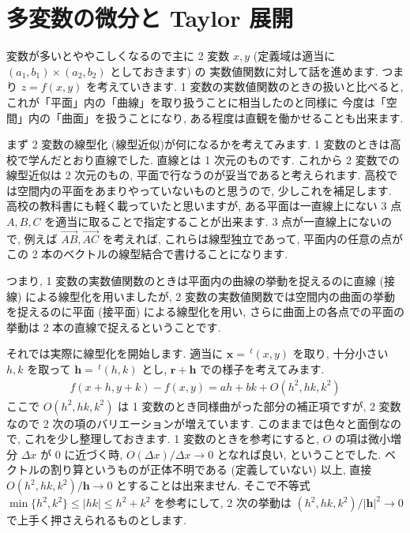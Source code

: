 \documentclass[openany, a4paper, oneside]{jsbook}
\begin{document}
\section{多変数の微分と Taylor 展開}

変数が多いとややこしくなるので主に 2 変数 $x,y$ (定義域は適当に $(a_1,b_1)\times (a_2,b_2)$ としておきます) の
実数値関数に対して話を進めます.
つまり $z=f (x,y)$ を考えていきます.
1 変数の実数値関数のときの扱いと比べると, これが「平面」内の「曲線」を取り扱うことに相当したのと同様に
今度は「空間」内の「曲面」を扱うことになり, ある程度は直観を働かせることも出来ます.

まず 2 変数の線型化 (線型近似)が何になるかを考えてみます.
1 変数のときは高校で学んだとおり直線でした.
直線とは 1 次元のものです.
これから 2 変数での線型近似は 2 次元のもの, 平面で行なうのが妥当であると考えられます.
高校では空間内の平面をあまりやっていないものと思うので, 少しこれを補足します.
高校の教科書にも軽く載っていたと思いますが, ある平面は一直線上にない 3 点 $A,B,C$ を適当に取ることで指定することが出来ます.
3 点が一直線上にないので, 例えば $\overrightarrow{AB},\overrightarrow{AC}$ を考えれば, これらは線型独立であって, 平面内の任意の点が
この 2 本のベクトルの線型結合で書けることになります.

つまり, 1 変数の実数値関数のときは平面内の曲線の挙動を捉えるのに直線 (接線) による線型化を用いましたが,
2 変数の実数値関数では空間内の曲面の挙動を捉えるのに平面 (接平面) による線型化を用い,
さらに曲面上の各点での平面の挙動は 2 本の直線で捉えるということです.

それでは実際に線型化を開始します.
適当に $\bm{x}=\,^t (x,y)$ を取り, 十分小さい $h,k$ を取って $\bm{h}=\,^t (h,k)$ とし,
 $\bm{r}+\bm{h}$ での様子を考えてみます.
\begin{align}
    f (x+h,y+k) - f (x,y)
    =
    ah + bk + O (h^2,h k,k^2)
\end{align}
ここで $O (h^2,h k,k^2)$ は 1 変数のとき同様曲がった部分の補正項ですが, 2 変数なので 2 次の項のバリエーションが増えています.
このままでは色々と面倒なので, これを少し整理しておきます.
1 変数のときを参考にすると,  $O$ の項は微小増分 $\Delta x$ が 0 に近づく時,  $O (\Delta x)/\Delta x \to 0$ となれば良い, ということでした.
ベクトルの割り算というものが正体不明である (定義していない) 以上, 直接 $O (h^2,h k,k^2)/\bm{h}\to0$ とすることは出来ません.
そこで不等式 $\min \{ h^2,k^2  \} \leq |h k|\leq h^2 + k^2$ を参考にして, 2 次の挙動は
 $(h^2,h k,k^2)/|\bm{h}|^2\to0$ で上手く押さえられるものとします.
\end{document}
